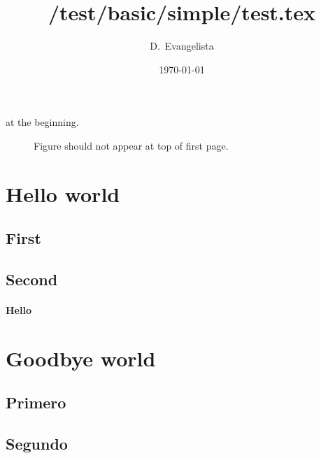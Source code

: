 \documentclass{article}
\title{/test/basic/simple/test.tex}
\author{D.~Evangelista}
\date{\today}
\begin{document}
\maketitle

 at the beginning. %

\begin{figure}[h]
\caption{Figure should not appear at top of first page.} %
\end{figure}

\section{Hello world}
\lipsum[1][1]

\subsection{First}
\lipsum[1][2]

\subsection{Second}
\lipsum[1][3]

\paragraph{Hello} \lipsum[1][4]

\section{Goodbye world}
\lipsum[2][1]

\subsection{Primero}
\lipsum[2][2]

\subsection{Segundo}
\lipsum[2][3]

\begin{fullwidth}
\small\itshape\lipsum[1]
\end{fullwidth}
\end{document}
